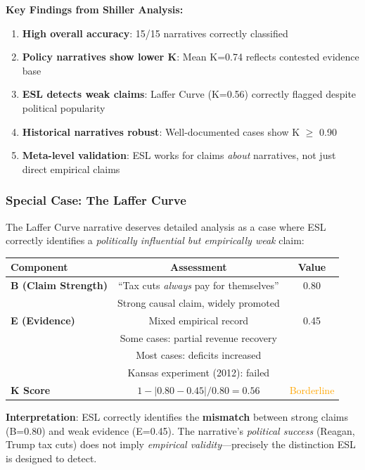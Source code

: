 \documentclass[11pt,a4paper]{article}
\begin{document}
\begin{resultbox}
\textbf{Key Findings from Shiller Analysis:}
\begin{enumerate}
    \item \textbf{High overall accuracy}: 15/15 narratives correctly classified
    \item \textbf{Policy narratives show lower K}: Mean K=0.74 reflects contested evidence base
    \item \textbf{ESL detects weak claims}: Laffer Curve (K=0.56) correctly flagged despite political popularity
    \item \textbf{Historical narratives robust}: Well-documented cases show K $\geq$ 0.90
    \item \textbf{Meta-level validation}: ESL works for claims \textit{about} narratives, not just direct empirical claims
\end{enumerate}
\end{resultbox}

\subsubsection{Special Case: The Laffer Curve}

The Laffer Curve narrative deserves detailed analysis as a case where ESL correctly identifies a \textit{politically influential but empirically weak} claim:

\begin{table}[h]
\centering
\begin{tabular}{lcc}
\toprule
\textbf{Component} & \textbf{Assessment} & \textbf{Value} \\
\midrule
\textbf{B (Claim Strength)} & ``Tax cuts \textit{always} pay for themselves'' & 0.80 \\
 & Strong causal claim, widely promoted & \\
\midrule
\textbf{E (Evidence)} & Mixed empirical record & 0.45 \\
 & Some cases: partial revenue recovery & \\
 & Most cases: deficits increased & \\
 & Kansas experiment (2012): failed & \\
\midrule
\textbf{K Score} & $1 - |0.80 - 0.45| / 0.80 = 0.56$ & \textcolor{orange}{Borderline} \\
\bottomrule
\end{tabular}
\end{table}

\textbf{Interpretation}: ESL correctly identifies the \textbf{mismatch} between strong claims (B=0.80) and weak evidence (E=0.45). The narrative's \textit{political success} (Reagan, Trump tax cuts) does not imply \textit{empirical validity}---precisely the distinction ESL is designed to detect.
\end{document}
